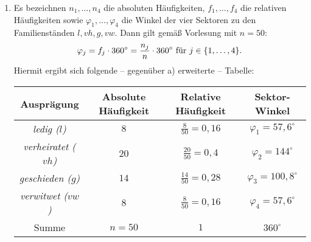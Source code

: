 \documentclass{exercise}
\begin{document}
\begin{enumerate}
\begin{center}
        \end{center}
        \item Es bezeichnen \(n_1, \ldots, n_4\) die absoluten Häufigkeiten, \(f_1, \ldots, f_4\) die relativen Häufigkeiten sowie \(\varphi_1, \ldots, \varphi_4\) die Winkel der vier Sektoren zu den Familienständen \(l, vh, g, vw\).
        Dann gilt gemäß Vorlesung mit \(n = 50\):
        \[
            \varphi_j = f_j \cdot 360^\circ = \frac{n_j}{n} \cdot 360^\circ\text{ für }j \in \braces*{1, \ldots, 4}.
        \]
        Hiermit ergibt sich folgende -- gegenüber a) erweiterte -- Tabelle:
        \begin{center}
            \begin{tabular}{cccc}
                \toprule
                Ausprägung & Absolute Häufigkeit & Relative Häufigkeit & Sektor-Winkel\\
                \midrule
                \emph{ledig (\(l\))} & \(8\) & \(\frac{8}{50} = 0,16\) & \(\varphi_1 = 57,6^\circ\)\\
                \emph{verheiratet (\(vh\))} & \(20\) & \(\frac{20}{50} = 0,4\) & \(\varphi_2 = 144^\circ\)\\
                \emph{geschieden (\(g\))} & \(14\) & \(\frac{14}{50} = 0,28\) & \(\varphi_3 = 100,8^\circ\)\\
                \emph{verwitwet (\(vw\))} & \(8\) & \(\frac{8}{50} = 0,16\) & \(\varphi_4 = 57,6^\circ\)\\
                \midrule
                Summe & \(n = 50\) & \(1\) & \(360^\circ\)\\
                \bottomrule
            \end{tabular}
        \end{center}
        \begin{center}
        \end{center}
    \end{enumerate}
\end{document}
